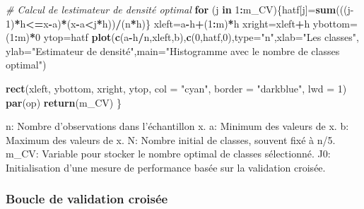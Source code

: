 \documentclass[
  12pt,
]{article}
\newenvironment{Shaded}{\begin{snugshade}}{\end{snugshade}}
\newcommand{\AttributeTok}[1]{\textcolor[rgb]{0.13,0.29,0.53}{#1}}
\newcommand{\CommentTok}[1]{\textcolor[rgb]{0.56,0.35,0.01}{\textit{#1}}}
\newcommand{\ControlFlowTok}[1]{\textcolor[rgb]{0.13,0.29,0.53}{\textbf{#1}}}
\newcommand{\DecValTok}[1]{\textcolor[rgb]{0.00,0.00,0.81}{#1}}
\newcommand{\FunctionTok}[1]{\textcolor[rgb]{0.13,0.29,0.53}{\textbf{#1}}}
\newcommand{\NormalTok}[1]{#1}
\newcommand{\OtherTok}[1]{\textcolor[rgb]{0.56,0.35,0.01}{#1}}
\newcommand{\SpecialCharTok}[1]{\textcolor[rgb]{0.81,0.36,0.00}{\textbf{#1}}}
\newcommand{\StringTok}[1]{\textcolor[rgb]{0.31,0.60,0.02}{#1}}
\begin{document}
\begin{Shaded}
\begin{Highlighting}[]
  \CommentTok{\# Calcul de l\textquotesingle{}estimateur de densité optimal}
  \ControlFlowTok{for}\NormalTok{ (j }\ControlFlowTok{in} \DecValTok{1}\SpecialCharTok{:}\NormalTok{m\_CV)\{hatf[j]}\OtherTok{=}\FunctionTok{sum}\NormalTok{(((j}\DecValTok{{-}1}\NormalTok{)}\SpecialCharTok{*}\NormalTok{h}\SpecialCharTok{\textless{}=}\NormalTok{x}\SpecialCharTok{{-}}\NormalTok{a)}\SpecialCharTok{*}\NormalTok{(x}\SpecialCharTok{{-}}\NormalTok{a}\SpecialCharTok{\textless{}}\NormalTok{j}\SpecialCharTok{*}\NormalTok{h))}\SpecialCharTok{/}\NormalTok{(n}\SpecialCharTok{*}\NormalTok{h)\}}
\NormalTok{  xleft}\OtherTok{=}\NormalTok{a}\SpecialCharTok{{-}}\NormalTok{h}\SpecialCharTok{+}\NormalTok{(}\DecValTok{1}\SpecialCharTok{:}\NormalTok{m)}\SpecialCharTok{*}\NormalTok{h}
\NormalTok{  xright}\OtherTok{=}\NormalTok{xleft}\SpecialCharTok{+}\NormalTok{h}
\NormalTok{  ybottom}\OtherTok{=}\NormalTok{(}\DecValTok{1}\SpecialCharTok{:}\NormalTok{m)}\SpecialCharTok{*}\DecValTok{0}
\NormalTok{  ytop}\OtherTok{=}\NormalTok{hatf}
  \FunctionTok{plot}\NormalTok{(}\FunctionTok{c}\NormalTok{(a}\SpecialCharTok{{-}}\NormalTok{h}\SpecialCharTok{/}\NormalTok{n,xleft,b),}\FunctionTok{c}\NormalTok{(}\DecValTok{0}\NormalTok{,hatf,}\DecValTok{0}\NormalTok{),}\AttributeTok{type=}\StringTok{"n"}\NormalTok{,}\AttributeTok{xlab=}\StringTok{"Les classes"}\NormalTok{, }
       \AttributeTok{ylab=}\StringTok{"Estimateur de densité"}\NormalTok{,}\AttributeTok{main=}\StringTok{"Histogramme avec le nombre de classes optimal"}\NormalTok{)}
  
  \FunctionTok{rect}\NormalTok{(xleft, ybottom, xright, ytop, }\AttributeTok{col =} \StringTok{"cyan"}\NormalTok{, }\AttributeTok{border =} \StringTok{"darkblue"}\NormalTok{, }\AttributeTok{lwd =} \DecValTok{1}\NormalTok{)}
  \FunctionTok{par}\NormalTok{(op)}
  \FunctionTok{return}\NormalTok{(m\_CV)}
\NormalTok{\}}
\end{Highlighting}
\end{Shaded}

n: Nombre d'observations dans l'échantillon x. a: Minimum des valeurs de
x. b: Maximum des valeurs de x. N: Nombre initial de classes, souvent
fixé à n/5. m\_CV: Variable pour stocker le nombre optimal de classes
sélectionné. J0: Initialisation d'une mesure de performance basée sur la
validation croisée.

\subsubsection{Boucle de validation
croisée}\label{boucle-de-validation-croisuxe9e}
\end{document}
